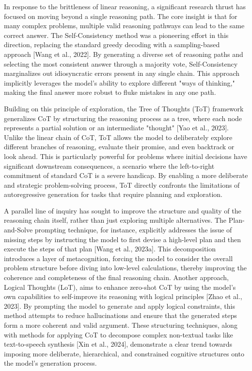 \documentclass[11pt]{article}
\begin{document}
In response to the brittleness of linear reasoning, a significant research thrust has focused on moving beyond a single reasoning path. The core insight is that for many complex problems, multiple valid reasoning pathways can lead to the same correct answer. The Self-Consistency method was a pioneering effort in this direction, replacing the standard greedy decoding with a sampling-based approach [Wang et al., 2022]. By generating a diverse set of reasoning paths and selecting the most consistent answer through a majority vote, Self-Consistency marginalizes out idiosyncratic errors present in any single chain. This approach implicitly leverages the model's ability to explore different "ways of thinking," making the final answer more robust to fluke mistakes in any one path.

Building on this principle of exploration, the Tree of Thoughts (ToT) framework generalizes CoT by structuring the reasoning process as a tree, where each node represents a partial solution or an intermediate "thought" [Yao et al., 2023]. Unlike the linear chain of CoT, ToT allows the model to deliberately explore different branches of reasoning, evaluate their promise, and even backtrack or look ahead. This is particularly powerful for problems where initial decisions have significant downstream consequences, a scenario where the left-to-right commitment of standard CoT is a severe handicap. By enabling a more deliberate and strategic problem-solving process, ToT directly confronts the limitations of autoregressive generation for tasks that require planning and exploration.

A parallel line of inquiry has sought to improve the structure and quality of the reasoning chain itself, rather than just exploring multiple alternatives. The Plan-and-Solve prompting technique, for instance, explicitly addresses the issue of missing steps by instructing the model to first devise a high-level plan and then execute the steps of that plan [Wang et al., 2023a]. This decomposition introduces a layer of metacognition, forcing the model to consider the overall problem structure before diving into low-level calculations, thereby improving the coherence and completeness of the final reasoning chain. Another approach, Logical Thoughts (LoT), aims to enhance zero-shot CoT by using the model's own capabilities to self-improve its reasoning with logical principles [Zhao et al., 2023]. By prompting the model to generate and apply logical constraints, this method attempts to reduce hallucinations and ensure that the generated steps form a more coherent and valid argument. These structuring techniques, along with methods for applying CoT to decompose complex non-textual tasks like text-to-speech synthesis [Xin et al., 2024], demonstrate a clear trend towards imposing more deliberate, hierarchical, and constrained cognitive structures onto the model's generation process.
\end{document}
